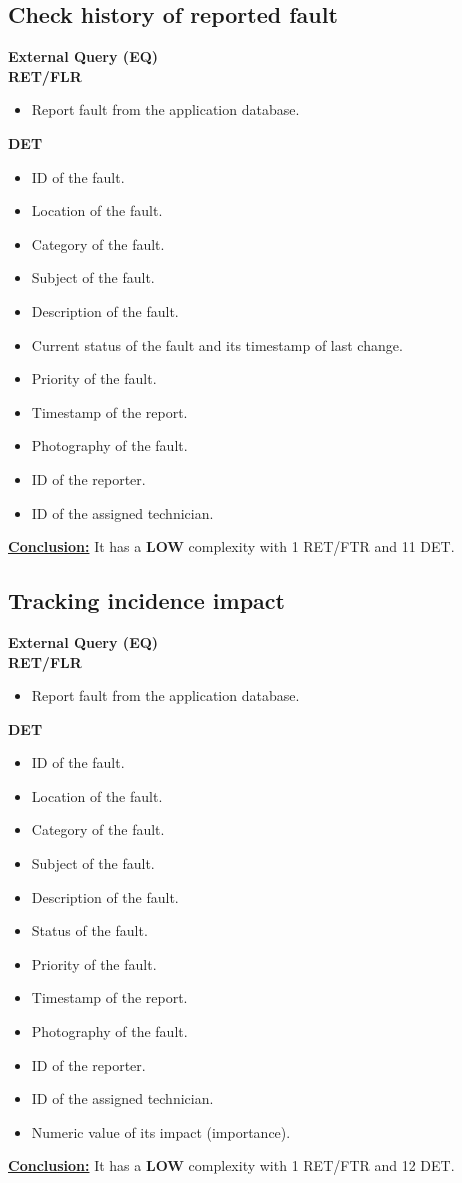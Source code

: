 \subsection{Check history of reported fault}
\textbf{External Query (EQ)} \\ 
\textbf{RET/FLR}
\begin{itemize}
\item Report fault from the application database.
\end{itemize}
\textbf{DET}
\begin{itemize}
\item ID of the fault.
\item Location of the fault.
\item Category of the fault.
\item Subject of the fault.
\item Description of the fault.
\item Current status of the fault and its timestamp of last change.
\item Priority of the fault.
\item Timestamp of the report.
\item Photography of the fault.
\item ID of the reporter.
\item ID of the assigned technician.
\end{itemize}
\textbf{\underline{Conclusion:}} It has a \textbf{LOW} complexity with 1 RET/FTR and 11 DET.

\subsection{Tracking incidence impact}
\textbf{External Query (EQ)} \\ 
\textbf{RET/FLR}
\begin{itemize}
\item Report fault from the application database.
\end{itemize}
\textbf{DET}
\begin{itemize}
\item ID of the fault.
\item Location of the fault.
\item Category of the fault.
\item Subject of the fault.
\item Description of the fault.
\item Status of the fault.
\item Priority of the fault.
\item Timestamp of the report.
\item Photography of the fault.
\item ID of the reporter.
\item ID of the assigned technician.
\item Numeric value of its impact (importance).
\end{itemize}
\textbf{\underline{Conclusion:}} It has a \textbf{LOW} complexity with 1 RET/FTR and 12 DET.

